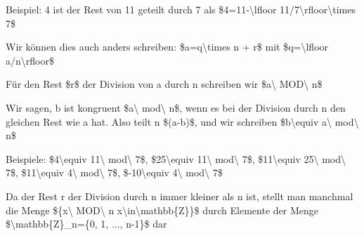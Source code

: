 \documentclass[a4paper]{article}
\begin{document}
\begin{multicols}{3}
\begin{itemize*}
            \begin{itemize*}
                  \item Beispiel: 4 ist der Rest von 11 geteilt durch 7 als \$4=11-\textbackslash lfloor 11/7\textbackslash rfloor\textbackslash times 7\$
                  \item Wir können dies auch anders schreiben: \$a=q\textbackslash times n + r\$ mit \$q=\textbackslash lfloor a/n\textbackslash rfloor\$
            \end{itemize*}
            \item
            Für den Rest \$r\$ der Division von a durch n schreiben wir
            \$a\textbackslash{} MOD\textbackslash{} n\$
            \item
            Wir sagen, b ist kongruent \$a\textbackslash{} mod\textbackslash{}
            n\$, wenn es bei der Division durch n den gleichen Rest wie a hat.
            Also teilt n \$(a-b)\$, und wir schreiben \$b\textbackslash equiv
            a\textbackslash{} mod\textbackslash{} n\$

            \begin{itemize*}
                  \item Beispiele: \$4\textbackslash equiv 11\textbackslash{} mod\textbackslash{} 7\$, \$25\textbackslash equiv 11\textbackslash{} mod\textbackslash{} 7\$, \$11\textbackslash equiv 25\textbackslash{} mod\textbackslash{} 7\$, \$11\textbackslash equiv 4\textbackslash{} mod\textbackslash{} 7\$, \$-10\textbackslash equiv 4\textbackslash{} mod\textbackslash{} 7\$
            \end{itemize*}
            \item
            Da der Rest r der Division durch n immer kleiner als n ist, stellt man
            manchmal die Menge \$\{x\textbackslash{} MOD\textbackslash{} n
            \textbar{} x\textbackslash in\textbackslash mathbb\{Z\}\}\$ durch
            Elemente der Menge \$\textbackslash mathbb\{Z\}\_n=\{0, 1, ...,
            n-1\}\$ dar
      \end{itemize*}


\end{multicols}
\end{document}
